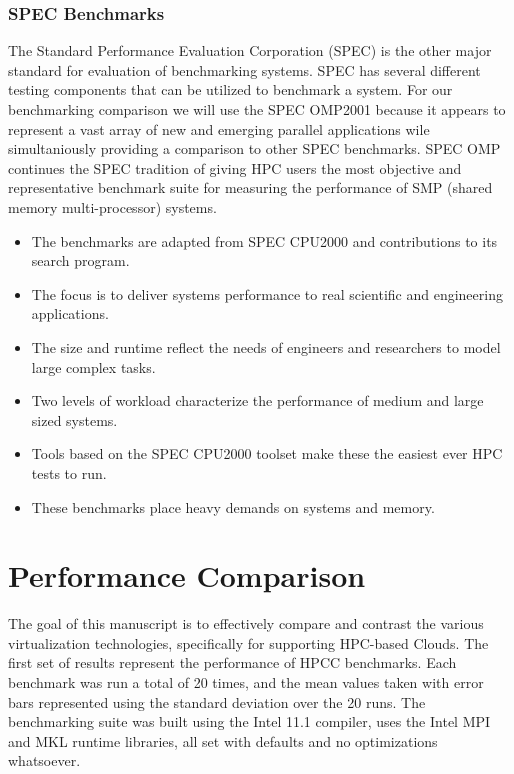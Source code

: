 \subsubsection{SPEC Benchmarks}

The Standard Performance Evaluation Corporation (SPEC) \cite{dixit1991, www-spec} is the other major standard for evaluation of benchmarking systems. SPEC has several different testing components that can be utilized to benchmark a system. For our benchmarking comparison we will use the SPEC OMP2001 because it appears to represent a vast array of new and emerging parallel applications wile simultaniously providing a comparison to other SPEC benchmarks.  SPEC OMP continues the SPEC tradition of giving HPC users the most objective and representative benchmark suite for measuring the performance of SMP (shared memory multi-processor) systems.

\begin{itemize}

\item The benchmarks are adapted from SPEC CPU2000 and contributions to its search program.
\item The focus is to deliver systems performance to real scientific and engineering applications.
\item The size and runtime reflect the needs of engineers and researchers to model large complex tasks.
\item Two levels of workload characterize the performance of medium and large sized systems.
\item Tools based on the SPEC CPU2000 toolset make these the easiest ever HPC tests to run.
\item These benchmarks place heavy demands on systems and memory.

\end{itemize}



\section{Performance Comparison}

The goal of this manuscript is to effectively compare and contrast the various virtualization technologies, specifically for supporting HPC-based Clouds.  The first set of results represent the performance of HPCC benchmarks.  Each benchmark was run a total of 20 times, and the mean values taken with error bars represented using the standard deviation over the 20 runs.  The benchmarking suite was built using the Intel 11.1 compiler, uses the Intel MPI and MKL runtime libraries, all set with defaults and no optimizations whatsoever.

